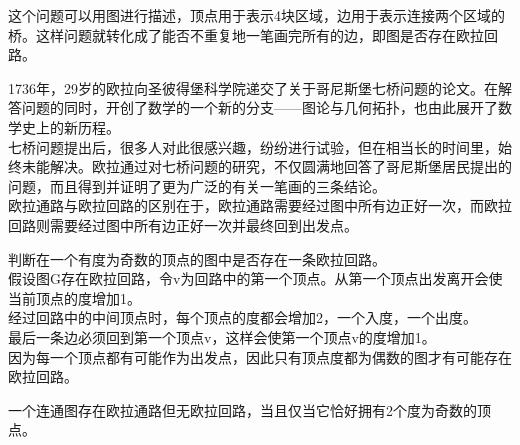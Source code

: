 这个问题可以用图进行描述，顶点用于表示4块区域，边用于表示连接两个区域的桥。这样问题就转化成了能否不重复地一笔画完所有的边，即图是否存在欧拉回路。

\begin{figure}[H]
	\centering
\end{figure}

1736年，29岁的欧拉向圣彼得堡科学院递交了关于哥尼斯堡七桥问题的论文。在解答问题的同时，开创了数学的一个新的分支——图论与几何拓扑，也由此展开了数学史上的新历程。\\

七桥问题提出后，很多人对此很感兴趣，纷纷进行试验，但在相当长的时间里，始终未能解决。欧拉通过对七桥问题的研究，不仅圆满地回答了哥尼斯堡居民提出的问题，而且得到并证明了更为广泛的有关一笔画的三条结论。\\

欧拉通路与欧拉回路的区别在于，欧拉通路需要经过图中所有边正好一次，而欧拉回路则需要经过图中所有边正好一次并最终回到出发点。

\begin{tcolorbox}
	判断在一个有度为奇数的顶点的图中是否存在一条欧拉回路。\\
	假设图G存在欧拉回路，令v为回路中的第一个顶点。从第一个顶点出发离开会使当前顶点的度增加1。\\
	经过回路中的中间顶点时，每个顶点的度都会增加2，一个入度，一个出度。\\
	最后一条边必须回到第一个顶点v，这样会使第一个顶点v的度增加1。\\
	因为每一个顶点都有可能作为出发点，因此只有顶点度都为偶数的图才有可能存在欧拉回路。
\end{tcolorbox}

一个连通图存在欧拉通路但无欧拉回路，当且仅当它恰好拥有2个度为奇数的顶点。

